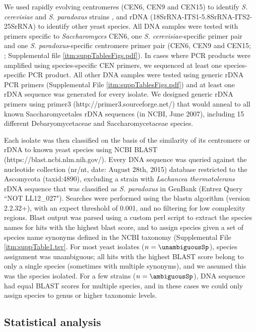 \documentclass[12pt]{article}
\begin{document}
\begin{linenumbers}
We used rapidly evolving centromeres (CEN6, CEN9 and CEN15) to identify \textit{S. cerevisiae} and \textit{S. paradoxus} strains \citep{bensasson_rapid_2008}, and rDNA (18SrRNA-ITS1-5.8SrRNA-ITS2-25SrRNA) to identify other yeast species. All DNA samples were tested with primers specific to \textit{Saccharomyces} CEN6, one \textit{S. cerevisiae}-specific primer pair and one \textit{S. paradoxus}-specific centromere primer pair (CEN6, CEN9 and CEN15; \citealp{bensasson_evidence_2011}; Supplemental file \ref{itm:suppTablesFigs.pdf}). In cases where PCR products were amplified using species-specific CEN primers, we sequenced at least one species-specific PCR product. All other DNA samples were tested using generic rDNA PCR primers (Supplemental File \ref{itm:suppTablesFigs.pdf}) and at least one rDNA sequence was generated for every isolate. We designed generic rDNA primers using primer3 (http://primer3.sourceforge.net/) that would anneal to all known Saccharomycetales rDNA sequences (in NCBI, June 2007), including 15 different Debaryomycetaceae and Saccharomycetaceae species. 

Each isolate was then classified on the basis of the similarity of its centromere or rDNA to known yeast species using NCBI BLAST (https://blast.ncbi.nlm.nih.gov/). Every DNA sequence was queried against the nucleotide collection (nr/nt, date: August 28th, 2015) database restricted to the Ascomycota (taxid:4890), excluding a strain with \textit{Lachancea thermotolerans} rDNA sequence that was classified as \textit{S. paradoxus} in GenBank (Entrez Query ``NOT LL12\_027"). Searches were performed using the blastn algorithm (version 2.2.32+), with an expect threshold of 0.001, and no filtering for low complexity regions. Blast output was parsed using a custom perl script to extract the species names for hits with the highest blast score, and to assign species given a set of species name synonyms defined in the NCBI taxonomy (Supplemental File \ref{itm:suppTable1.tsv}. For most yeast isolates ($n=\unambiguousSp$), species assignment was unambiguous; all hits with the highest BLAST score belong to only a single species (sometimes with multiple synonyms), and we assumed this was the species isolated. For a few strains ($n=\ambiguousSp$), DNA sequence had equal BLAST scores for multiple species, and in these cases we could only assign species to genus or higher taxonomic levels. 


\subsection*{Statistical analysis}


\end{linenumbers}
\end{document}
